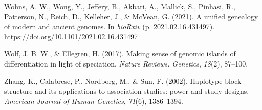 \documentclass[twocolumn]{bmcart}%
\begin{document}
\begin{backmatter}
\begin{hangparas}{1em}{1}
Wohns, A. W., Wong, Y., Jeffery, B., Akbari, A., Mallick, S., Pinhasi,
R., Patterson, N., Reich, D., Kelleher, J., \& McVean, G. (2021). A
unified genealogy of modern and ancient genomes. In \emph{bioRxiv} (p.
2021.02.16.431497). https://doi.org/10.1101/2021.02.16.431497

Wolf, J. B. W., \& Ellegren, H. (2017). Making sense of genomic islands
of differentiation in light of speciation. \emph{Nature Reviews.
Genetics}, \emph{18}(2), 87--100.

Zhang, K., Calabrese, P., Nordborg, M., \& Sun, F. (2002). Haplotype
block structure and its applications to association studies: power and
study designs. \emph{American Journal of Human Genetics}, \emph{71}(6),
1386--1394.

\end{hangparas}








\end{backmatter}
\end{document}
